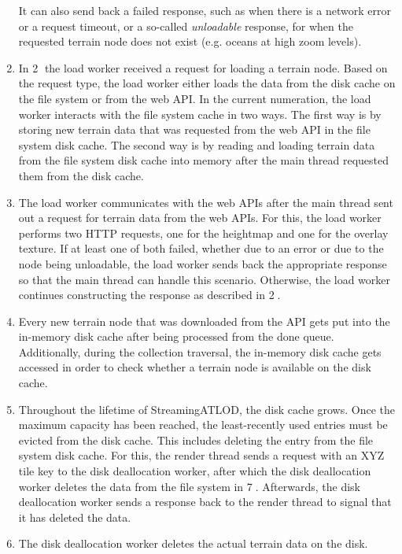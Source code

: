 \begin{enumerate}[label=\textcircled{\arabic*}]
        It can also send back a failed response, such as when there is a network error 
        or a request timeout, or a so-called \textit{unloadable} response, for when 
        the requested terrain node does not exist (e.g. oceans at high zoom levels).
  \item In \textcircled{2} the load worker received a request for loading a terrain node. 
        Based on the request type, the load worker either loads the data 
        from the disk cache on the file system or from the web API.
        In the current numeration, the load worker interacts with the file system cache in two ways.
        The first way is by storing new terrain data that 
        was requested from the web API in the file system disk cache.
        The second way is by reading and loading terrain data from the 
        file system disk cache into memory after the main thread 
        requested them from the disk cache.
  \item The load worker communicates with the web APIs after the 
        main thread sent out a request for terrain data from the web APIs. 
        For this, the load worker performs 
        two HTTP requests, one for the heightmap and one for the overlay texture.
        If at least one of both failed, whether due to an error or due 
        to the node being unloadable, the load worker sends back the appropriate 
        response so that the main thread can handle this scenario. 
        Otherwise, the load worker continues constructing the response as described in \textcircled{2}.
  \item Every new terrain node that was downloaded from the API gets put into the in-memory disk cache after being 
        processed from the done queue.
        Additionally, during the collection traversal, the in-memory disk cache gets accessed 
        in order to check whether a terrain node is available on the disk cache.
  \item Throughout the lifetime of StreamingATLOD, the disk cache grows. Once the maximum 
        capacity has been reached, the least-recently used entries must be evicted from the disk cache.
        This includes deleting the entry from the file system disk cache.
        For this, the render thread sends a request with an XYZ tile key to the disk deallocation worker,
        after which the disk deallocation worker deletes the data from the file system in \textcircled{7}.
        Afterwards, the disk deallocation worker sends a response back to the render thread 
        to signal that it has deleted the data.
  \item The disk deallocation worker deletes the actual terrain data on the disk.

\end{enumerate}

